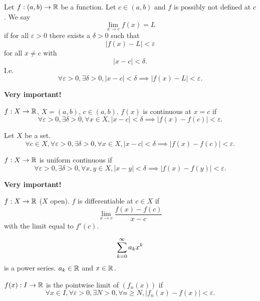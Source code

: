 \documentclass[10pt, a4paper]{article}
\begin{document}
\begin{definition}
    Let $f : (a, b) \to \mathbb{R}$ be a function.
    Let $c \in (a, b)$ and $f$ is possibly not defined at $c$.
    We say
    \[
    \lim_{x \to c}f(x) = L
    \]
    if for all $\varepsilon > 0$ there exists a $\delta > 0$ such that
    \[
    |f(x) - L| < \varepsilon
    \]
    for all $x \neq c$ with
    \[
    |x - c| < \delta.
    \]
    I.e.
    \[
    \forall \varepsilon > 0, \exists \delta > 0, |x - c| < \delta \implies |f(x) - L| < \varepsilon.
    \]
\end{definition}

\textbf{Very important!}
\begin{definition}
    $f : X \to \mathbb{R}$,
    $X = (a, b)$,
    $c \in (a, b)$.
    $f(x)$ is continuous at $x = c$ if
    \[
    \forall \varepsilon > 0, \exists \delta > 0, \forall x \in X, |x - c| < \delta \implies |f(x) - f(c)| < \varepsilon.
    \]
\end{definition}

\begin{definition}
    Let $X$ be a set.
    \[
    \forall c \in X, \forall \varepsilon > 0, \exists \delta > 0, \forall x \in X, |x - c| < \delta \implies |f(x) - f(c)| < \varepsilon.
    \]
\end{definition}

\begin{definition}
    $f : X \to \mathbb{R}$ is uniform continuous if
    \[
    \forall \varepsilon > 0, \exists \delta > 0, \forall x, y \in X, |x - y| < \delta \implies |f(x) - f(y)| < \varepsilon.
    \]
\end{definition}

\textbf{Very important!}
\begin{definition}[Differentiability]
    $f : X \to \mathbb{R}$
    ($X$ open).
    $f$ is differentiable at $c \in X$ if
    \[
    \lim_{x \to c}\frac{f(x) - f(c)}{x - c}
    \]
    with the limit equal to $f'(c)$.
\end{definition}

\begin{definition}
    \[
    \sum_{k = 0}^{\infty} a_kx ^ k
    \]
    is a power series.
    $a_k \in \mathbb{R}$ and $x \in \mathbb{R}$.
\end{definition}

\begin{definition}
    $f(x) : I \to \mathbb{R}$ is the pointwise limit of $(f_n(x))$ if
    \[
    \forall x \in I, \forall \varepsilon > 0, \exists N > 0, \forall n \geq N, |f_n(x) - f(x)| < \varepsilon.
    \]
\end{definition}
\end{document}
